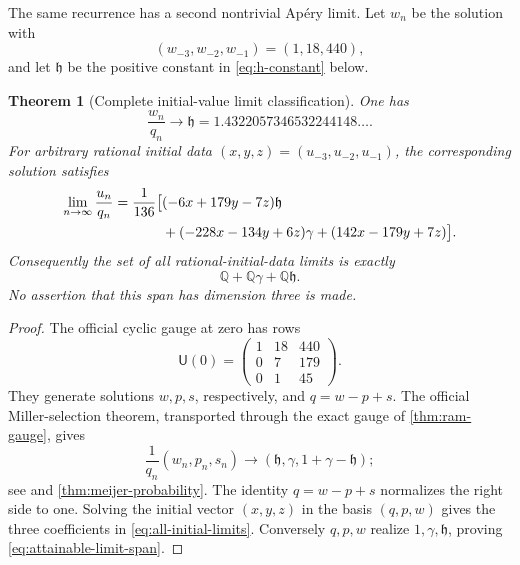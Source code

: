 \documentclass[11pt]{article}
\newtheorem{theorem}{Theorem}[section]
\theoremstyle{definition}
\theoremstyle{remark}
\newcommand{\Q}{\mathbb Q}
\begin{document}
The same recurrence has a second nontrivial Ap\'ery limit.  Let \(w_n\) be
the solution with
\begin{equation}\label{eq:w-initial}
 (w_{-3},w_{-2},w_{-1})=(1,18,440),
\end{equation}
and let \(\mathfrak h\) be the positive constant in
\eqref{eq:h-constant} below.

\begin{theorem}[Complete initial-value limit classification]
\label{thm:ram-full-solution}
One has
\begin{equation}\label{eq:w-limit}
 \boxed{\displaystyle\frac{w_n}{q_n}\longrightarrow\mathfrak h
 =1.4322057346532244148\ldots.}
\end{equation}
For arbitrary rational initial data
\((x,y,z)=(u_{-3},u_{-2},u_{-1})\), the corresponding solution satisfies
\begin{align}
 \lim_{n\to\infty}\frac{u_n}{q_n}
 =\frac1{136}\bigl[&(-6x+179y-7z)\mathfrak h\notag\\
 &+(-228x-134y+6z)\gamma
 +(142x-179y+7z)\bigr].
 \label{eq:all-initial-limits}
\end{align}
Consequently the set of all rational-initial-data limits is exactly
\begin{equation}\label{eq:attainable-limit-span}
 \boxed{\Q+\Q\gamma+\Q\mathfrak h.}
\end{equation}
No assertion that this span has dimension three is made.
\end{theorem}

\begin{proof}
The official cyclic gauge at zero has rows
\begin{equation}\label{eq:U0-rows}
 \mathsf U(0)=
 \begin{pmatrix}1&18&440\\0&7&179\\0&1&45\end{pmatrix}.
\end{equation}
They generate solutions \(w,p,s\), respectively, and
\(q=w-p+s\).  The official Miller-selection theorem, transported through
the exact gauge of \cref{thm:ram-gauge}, gives
\begin{equation}\label{eq:Miller-limit-vector}
 \frac1{q_n}(w_n,p_n,s_n)
 \longrightarrow
 (\mathfrak h,\gamma,1+\gamma-\mathfrak h);
\end{equation}
see \cite[\S5.2]{RamanujanOfficial2026} and
\cref{thm:meijer-probability}.  The identity \(q=w-p+s\) normalizes the
right side to one.  Solving the initial vector
\((x,y,z)\) in the basis \((q,p,w)\) gives the three coefficients in
\eqref{eq:all-initial-limits}.  Conversely \(q,p,w\) realize
\(1,\gamma,\mathfrak h\), proving \eqref{eq:attainable-limit-span}.
\end{proof}
\end{document}
